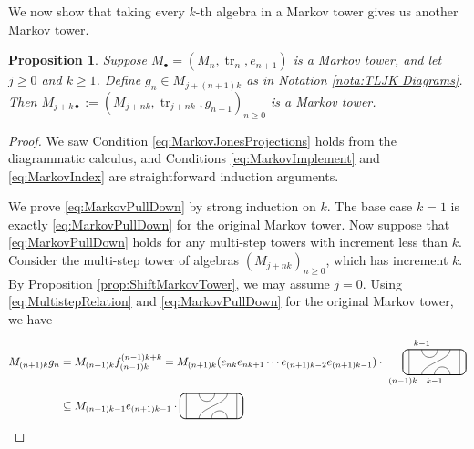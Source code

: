 \documentclass[11pt]{article}
\theoremstyle{plain}
\newtheorem{prop}[thm]{Proposition}
\theoremstyle{definition}
\DeclareMathOperator{\tr}{tr}
\begin{document}
We now show that taking every $k$-th algebra in a Markov tower gives us another Markov tower.

\begin{prop}
\label{prop:MultistepJonesProjections}
Suppose $M_\bullet=(M_n, \tr_n, e_{n+1})$ is a Markov tower, and let $j\geq 0$ and $k\geq 1$.
Define $g_n \in M_{j+(n+1)k}$ as in Notation \ref{nota:TLJK Diagrams}.
Then $M_{j+k\bullet}:=(M_{j+nk}, \tr_{j+nk}, g_{n+1})_{n\geq 0}$ is a Markov tower.
\end{prop}
\begin{proof}
We saw Condition \ref{eq:MarkovJonesProjections} holds from the diagrammatic calculus, and Conditions \ref{eq:MarkovImplement} and \ref{eq:MarkovIndex} are straightforward induction arguments.

We prove \ref{eq:MarkovPullDown} by strong induction on $k$.
The base case $k=1$ is exactly \ref{eq:MarkovPullDown} for the original Markov tower.
Now suppose that \ref{eq:MarkovPullDown} holds for any multi-step towers with increment less than $k$.
Consider the multi-step tower of algebras $(M_{j+nk})_{n\geq 0}$, which has increment $k$.
By Proposition \ref{prop:ShiftMarkovTower}, we may assume $j=0$.
Using \eqref{eq:MultistepRelation} and \ref{eq:MarkovPullDown} for the original Markov tower, we have 
\begin{align*}
M_{(n+1)k} g_n 
&= 
M_{(n+1)k} f^{(n-1)k+k}_{(n-1)k} 
= 
M_{(n+1)k}
(e_{nk}e_{nk+1}\cdots e_{(n+1)k-2}e_{(n+1)k-1})
\cdot
\begin{tikzpicture}[baseline = .3cm]
 \draw[thick, rounded corners = 5pt] (0,0) rectangle (2,.8);
 \draw (.2,0) -- (.2,.8);
 \draw (1.8,0) -- (1.8,.8);
 \draw (.6,.8) arc (-180:0:.25cm);
 \draw (.6,0)  .. controls ++(90:.35cm) and ++(270:.35cm) .. (1.5,.8);
 \draw (1,0) arc (180:0:.25cm);
 \node at (.6,1) {\scriptsize{$k{-}1$}};
 \node at (1,-.2) {\scriptsize{$k{-}1$}};
 \node at (0,-.2) {\scriptsize{$(n{-}1)k$}};
\end{tikzpicture}
\\&\subseteq
M_{(n+1)k-1} 
e_{(n+1)k-1}
\cdot
\begin{tikzpicture}[baseline = .3cm]
 \draw[thick, rounded corners = 5pt] (0,0) rectangle (2,.8);
 \draw (.2,0) -- (.2,.8);
 \draw (1.8,0) -- (1.8,.8);
 \draw (.6,.8) arc (-180:0:.25cm);
 \draw (.6,0)  .. controls ++(90:.35cm) and ++(270:.35cm) .. (1.5,.8);
 \draw (1,0) arc (180:0:.25cm);

\end{tikzpicture}
\end{align*}
\end{proof}
\end{document}
